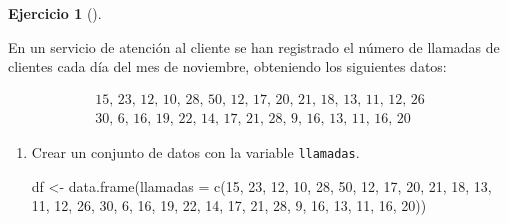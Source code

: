 \documentclass[
  spanish,
  a4paper,
]{scrreport}
\newenvironment{Shaded}{\begin{snugshade}}{\end{snugshade}}
\newcommand{\AttributeTok}[1]{\textcolor[rgb]{0.40,0.45,0.13}{#1}}
\newcommand{\DecValTok}[1]{\textcolor[rgb]{0.68,0.00,0.00}{#1}}
\newcommand{\FunctionTok}[1]{\textcolor[rgb]{0.28,0.35,0.67}{#1}}
\newcommand{\NormalTok}[1]{\textcolor[rgb]{0.00,0.23,0.31}{#1}}
\newcommand{\OtherTok}[1]{\textcolor[rgb]{0.00,0.23,0.31}{#1}}
\theoremstyle{definition}
\newtheorem{exercise}{Ejercicio}[chapter]
\theoremstyle{remark}
\begin{document}
\begin{exercise}[]\protect\hypertarget{exr-frecuencias-graficos-2}{}\label{exr-frecuencias-graficos-2}

En un servicio de atención al cliente se han registrado el número de
llamadas de clientes cada día del mes de noviembre, obteniendo los
siguientes datos:

\[
\begin{array}{c}
\mbox{15, 23, 12, 10, 28, 50, 12, 17, 20, 21, 18, 13, 11, 12, 26} \\
\mbox{30, 6, 16, 19, 22, 14, 17, 21, 28, 9, 16, 13, 11, 16, 20}
\end{array}
\]

\begin{enumerate}
\def\labelenumi{\alph{enumi}.}
\item
  Crear un conjunto de datos con la variable \texttt{llamadas}.

  \begin{tcolorbox}[enhanced jigsaw, colback=white, opacityback=0, title=\textcolor{quarto-callout-tip-color}{\faLightbulb}\hspace{0.5em}{Solución}, toprule=.15mm, titlerule=0mm, breakable, toptitle=1mm, colframe=quarto-callout-tip-color-frame, coltitle=black, opacitybacktitle=0.6, bottomrule=.15mm, arc=.35mm, colbacktitle=quarto-callout-tip-color!10!white, leftrule=.75mm, bottomtitle=1mm, rightrule=.15mm, left=2mm]

\begin{Shaded}
\begin{Highlighting}[]
\NormalTok{df }\OtherTok{\textless{}{-}} \FunctionTok{data.frame}\NormalTok{(}\AttributeTok{llamadas =} \FunctionTok{c}\NormalTok{(}\DecValTok{15}\NormalTok{, }\DecValTok{23}\NormalTok{, }\DecValTok{12}\NormalTok{, }\DecValTok{10}\NormalTok{, }\DecValTok{28}\NormalTok{, }\DecValTok{50}\NormalTok{, }\DecValTok{12}\NormalTok{, }\DecValTok{17}\NormalTok{, }\DecValTok{20}\NormalTok{, }\DecValTok{21}\NormalTok{, }\DecValTok{18}\NormalTok{, }\DecValTok{13}\NormalTok{, }\DecValTok{11}\NormalTok{, }\DecValTok{12}\NormalTok{, }\DecValTok{26}\NormalTok{, }\DecValTok{30}\NormalTok{, }\DecValTok{6}\NormalTok{, }\DecValTok{16}\NormalTok{, }\DecValTok{19}\NormalTok{, }\DecValTok{22}\NormalTok{, }\DecValTok{14}\NormalTok{, }\DecValTok{17}\NormalTok{, }\DecValTok{21}\NormalTok{, }\DecValTok{28}\NormalTok{, }\DecValTok{9}\NormalTok{, }\DecValTok{16}\NormalTok{, }\DecValTok{13}\NormalTok{, }\DecValTok{11}\NormalTok{, }\DecValTok{16}\NormalTok{, }\DecValTok{20}\NormalTok{))}
\end{Highlighting}
\end{Shaded}


\end{tcolorbox}
\end{enumerate}
\end{exercise}
\end{document}
